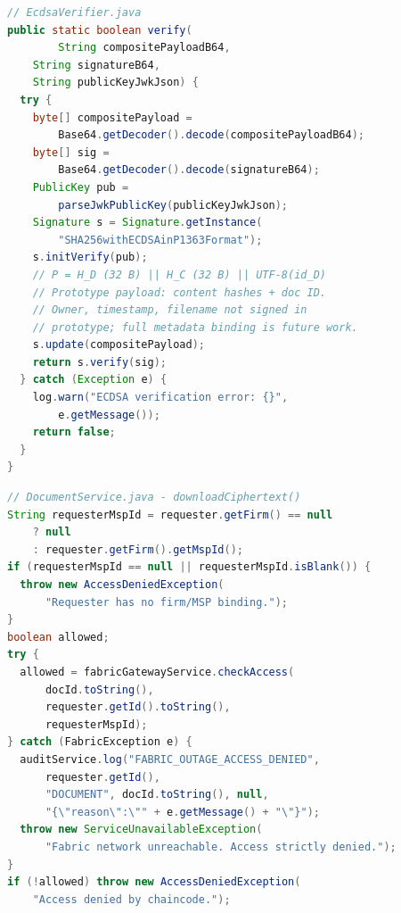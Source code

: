 \documentclass[preprint,12pt]{elsarticle}
\begin{document}
\begin{lstlisting}[language=Java,
    caption={Server-side ECDSA P-256 verification.
    \texttt{SHA256withECDSAinP1363Format} natively consumes
    WebCrypto's raw $r \| s$ output without format conversion.},
    label=lst:ecdsa]
// EcdsaVerifier.java
public static boolean verify(
        String compositePayloadB64,
    String signatureB64,
    String publicKeyJwkJson) {
  try {
    byte[] compositePayload =
        Base64.getDecoder().decode(compositePayloadB64); 
    byte[] sig =
        Base64.getDecoder().decode(signatureB64);
    PublicKey pub =
        parseJwkPublicKey(publicKeyJwkJson);
    Signature s = Signature.getInstance(
        "SHA256withECDSAinP1363Format");
    s.initVerify(pub);
    // P = H_D (32 B) || H_C (32 B) || UTF-8(id_D)
    // Prototype payload: content hashes + doc ID.
    // Owner, timestamp, filename not signed in
    // prototype; full metadata binding is future work.
    s.update(compositePayload);
    return s.verify(sig);
  } catch (Exception e) {
    log.warn("ECDSA verification error: {}",
        e.getMessage());
    return false;
  }
}
\end{lstlisting}

\begin{lstlisting}[language=Java,
    caption={Strict fail-closed ACL in the document download path. Layer 1:
    Spring Security \texttt{@PreAuthorize}. Layer 2: \texttt{CheckAccess}
    chaincode. If Fabric is unreachable, the system strictly denies access
    and logs \texttt{FABRIC\_OUTAGE\_ACCESS\_DENIED}.},
    label=lst:download]
// DocumentService.java - downloadCiphertext()
String requesterMspId = requester.getFirm() == null
    ? null
    : requester.getFirm().getMspId();
if (requesterMspId == null || requesterMspId.isBlank()) {
  throw new AccessDeniedException(
      "Requester has no firm/MSP binding.");
}
boolean allowed;
try {
  allowed = fabricGatewayService.checkAccess(
      docId.toString(),
      requester.getId().toString(),
      requesterMspId);
} catch (FabricException e) {
  auditService.log("FABRIC_OUTAGE_ACCESS_DENIED",
      requester.getId(),
      "DOCUMENT", docId.toString(), null,
      "{\"reason\":\"" + e.getMessage() + "\"}");
  throw new ServiceUnavailableException(
      "Fabric network unreachable. Access strictly denied.");
}
if (!allowed) throw new AccessDeniedException(
    "Access denied by chaincode.");
\end{lstlisting}
\end{document}

